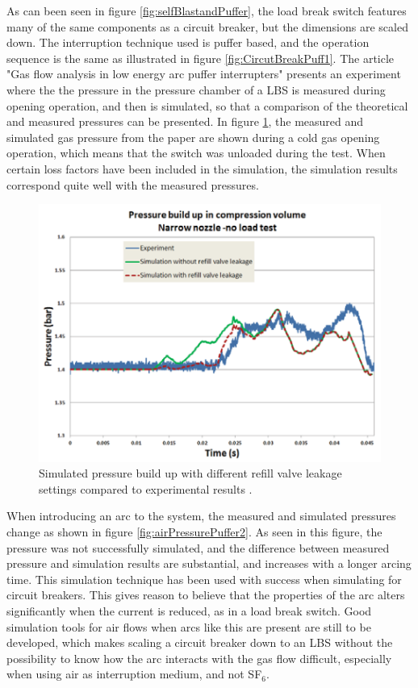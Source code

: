 \documentclass[10pt,b5paper,twoside]{article}
\begin{document}
As can been seen in figure \ref{fig:selfBlastandPuffer}, the load break switch features many of the same components as a circuit breaker, but the dimensions are scaled down. The interruption technique used is puffer based, and the operation sequence is the same as illustrated in figure \ref{fig:CircutBreakPuff1}. The article "Gas flow analysis in low energy arc puffer interrupters" \cite{bib:CBAC} presents an experiment where the the pressure in the pressure chamber of a LBS is measured during opening operation, and then is simulated, so that a comparison of the theoretical and measured pressures can be presented. In figure \ref{fig:airPressurePuffer}, the measured and simulated gas pressure from the paper are shown during a cold gas opening operation, which means that the switch was unloaded during the test. When certain loss factors have been included in the simulation, the simulation results correspond quite well with the measured pressures.


\begin{figure} [H]
\centering
\includegraphics[scale=0.6]{Bilder/Theory/tankPressure.png}
\caption{Simulated pressure build up with different refill valve leakage settings compared to experimental results  \cite{bib:CBAC}.} \label{fig:airPressurePuffer}
\end{figure}

When introducing an arc to the system, the measured and simulated pressures change as shown in figure \ref{fig:airPressurePuffer2}. As seen in this figure, the pressure was not successfully simulated, and the difference between measured pressure and simulation results are substantial, and increases with a longer arcing time. This simulation technique has been used with success when simulating for circuit breakers. This gives reason to believe that the properties of the arc alters significantly when the current is reduced, as in a load break switch. Good simulation tools for air flows when arcs like this are present are still to be developed, which makes scaling a circuit breaker down to an LBS without the possibility to know how the arc interacts with the gas flow difficult, especially when using air as interruption medium, and not SF$_6$.
\end{document}
